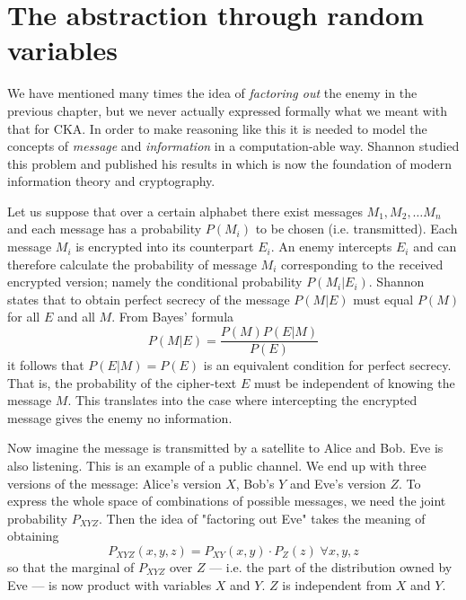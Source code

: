 \section{The abstraction through random variables}
    We have mentioned many times the idea of \textit{factoring out} the enemy in the previous chapter, but we never actually expressed formally what we meant with that for CKA.
    In order to make reasoning like this it is needed to model the concepts of \textit{message} and \textit{information} in a computation-able way.
    Shannon studied this problem and published his results in \cite{Shannon49} which is now the foundation of modern information theory and cryptography.
    
    Let us suppose that over a certain alphabet there exist messages $M_1,M_2,\ldots M_n$ and each message has a probability $P(M_i)$ to be chosen (i.e. transmitted).
    Each message $M_i$ is encrypted into its counterpart $E_i$.
    An enemy intercepts $E_i$ and can therefore calculate the probability of message $M_i$ corresponding to the received encrypted version; namely the conditional probability $P(M_i|E_i)$.
    Shannon states that to obtain perfect secrecy of the message $P(M|E)$ must equal $P(M)$ for all $E$ and all $M$.
    From Bayes' formula
    \begin{equation}
    	P(M|E) = \frac{P(M)P(E|M)}{P(E)}
    \end{equation}
    it follows that $P(E|M)=P(E)$ is an equivalent condition for perfect secrecy.
    That is, the probability of the cipher-text $E$ must be independent of knowing the message $M$.
    This translates into the case where intercepting the encrypted message gives the enemy no information. 
    
    Now imagine the message is transmitted by a satellite to Alice and Bob.
    Eve is also listening. This is an example of a public channel.
    We end up with three versions of the message\footnotemark : Alice's version $X$, Bob's $Y$ and Eve's version $Z$.
    To express the whole space of combinations of possible messages, we need the joint probability $P_{XYZ}$.
    Then the idea of "factoring out Eve" takes the meaning of obtaining 
    \begin{equation}
    	P_{XYZ}(x,y,z) = P_{XY}(x,y)\cdot P_Z(z) \; \forall x,y,z
    \end{equation}
    so that the marginal of $P_{XYZ}$ over $Z$ --- i.e. the part of the distribution owned by Eve --- is now product with variables $X$ and $Y$. $Z$ is independent from $X$ and $Y$.
    
